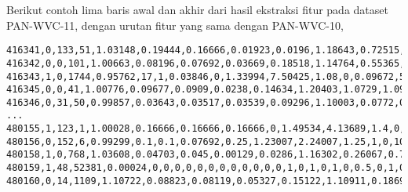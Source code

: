 Berikut contoh lima baris awal dan akhir dari hasil ekstraksi fitur pada
dataset PAN-WVC-11, dengan urutan fitur yang sama dengan PAN-WVC-10,

\begin{lstlisting}[style=data,basicstyle=\scriptsize\ttfamily]
416341,0,133,51,1.03148,0.19444,0.16666,0.01923,0.0196,1.18643,0.72515,1.05882,0,0.21505,8,0,0,0.5,0.18181,0.4923,0,0.5,0,0.5,0,0.5,0,0.49275,0
416342,0,0,101,1.00663,0.08196,0.07692,0.03669,0.18518,1.14764,0.55365,0.9537,3,0.12137,11,2,0.05882,0.5,0.47058,0.5,0,0.5,0,0.5,0,0.5,0,0.5,0
416343,1,0,1744,0.95762,17,1,0.03846,0,1.33994,7.50425,1.08,0,0.09672,5,0,0,0.50299,0,0.51133,0.5,0.49777,0,0.5,0,0.51029,0.5,0.51047,1
416345,0,0,41,1.00776,0.09677,0.0909,0.0238,0.14634,1.20403,1.0729,1.09756,2,0.04375,13,2,0.2,0.5,0.4,0.5,0,0.5,0,0.5,0,0.5,0,0.5,0
416346,0,31,50,0.99857,0.03643,0.03517,0.03539,0.09296,1.10003,0.0772,0.66356,49,0.43945,13,2,0.00357,0.5,0.41785,0.50261,0.01071,0.52631,0,0.5,0,0.5,0.00714,0.50279,0
...
480155,1,123,1,1.00028,0.16666,0.16666,0.16666,0,1.49534,4.13689,1.4,0,0,5,2,0,0.5,1,0.49886,0,0.5,0,0.5,0,0.5,0,0.49896,0
480156,0,152,6,0.99299,0.1,0.1,0.07692,0.25,1.23007,2.24007,1.25,1,0,10,2,0,0.5,0,0.5,0,0.5,0,0.5,0,0.5,0,0.5,0
480158,1,0,768,1.03608,0.04703,0.045,0.00129,0.0286,1.16302,0.26067,0.71521,0,0.34586,12,2,0.02083,0.46938,0.41666,0.4744,0.01388,0.47058,0,0.5,0,0.46902,0.04861,0.47368,1
480159,1,48,52381,0.00024,0,0,0,0,0,0,0,0,0,0,0,0,1,0,1,0,1,0,0.5,0,1,0,1,1
480160,0,14,1109,1.10722,0.08823,0.08119,0.05327,0.15122,1.10911,0.18691,0.64685,71,0.29261,32,3,0.03539,0.48437,0.50442,0.47991,0,0.5,0,0.5,0,0.48965,0,0.48135,0
\end{lstlisting}
